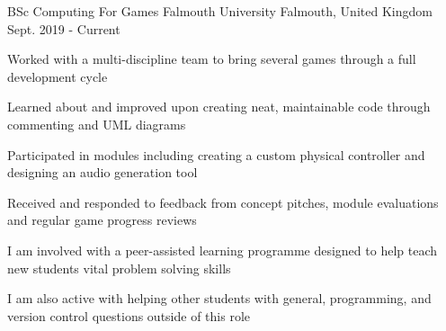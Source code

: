

\begin{cventries}

  \cventry
    {BSc Computing For Games} %
    {Falmouth University} %
    {Falmouth, United Kingdom} %
    {Sept. 2019 - Current} %
    {
      \begin{cvitems} %
        \item Worked with a multi-discipline team to bring several games through a full development cycle
        \item Learned about and improved upon creating neat, maintainable code through commenting and UML diagrams
        \item Participated in modules including creating a custom physical controller and designing an audio generation tool
        \item Received and responded to feedback from concept pitches, module evaluations and regular game progress reviews
        \item I am involved with a peer-assisted learning programme designed to help teach new students vital problem solving skills
        \item I am also active with helping other students with general, programming, and version control questions outside of this role
      \end{cvitems}
    }

\end{cventries}